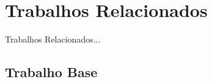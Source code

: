 \chapter{Trabalhos Relacionados}
\label{trabalhos}

{\color{red} Trabalhos Relacionados...}

\section{Trabalho Base}
\label{trabalhos:base}